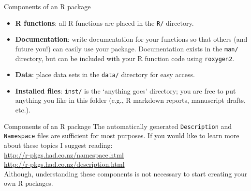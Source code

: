 \documentclass{beamer}
\begin{document}
\begin{frame}{Components of an R package}
\begin{itemize}
\item \textbf{R functions}:  all R functions are placed in the \texttt{R/} directory.
\vspace{1ex}
\item \textbf{Documentation}: write documentation for your functions so that others (and future you!) can easily use your package.  Documentation exists in the \texttt{man/} directory, but can be included with your R function code using \texttt{roxygen2}.
\vspace{1ex}
\item \textbf{Data}: place data sets in the \texttt{data/} directory for easy access.
\vspace{1ex}
\item \textbf{Installed files}: \texttt{inst/} is the `anything goes' directory; you are free to put anything you like in this folder (e.g., R markdown reports, manuscript drafts, etc.).
\end{itemize}
\end{frame}


\begin{frame}{Components of an R package}
The automatically generated \texttt{Description} and \texttt{Namespace} files are sufficient for most purposes.  If you would like to learn more about these topics I suggest reading:\\
\vspace{3ex}
\url{http://r-pkgs.had.co.nz/namespace.html}\\
\url{http://r-pkgs.had.co.nz/description.html}\\
\vspace{3ex}
Although, understanding these components is not necessary to start creating your own R packages.
\end{frame}
\end{document}
